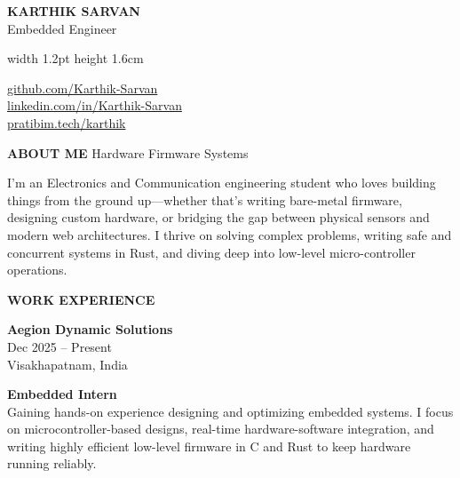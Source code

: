 \documentclass[10pt,a4paper]{article}
\newcommand{\cvsection}[2]{
    \vspace{1.5em}
    \noindent
    \textbf{\uppercase{#1}} \hspace{0.8em} {\color{linegray}\hrulefill} \hspace{0.8em} \textcolor{textblack}{#2}
    \vspace{0.8em}
}
\newcommand{\cvsectionstandard}[1]{
    \vspace{1.5em}
    \noindent
    \textbf{\uppercase{#1}} \hspace{0.8em} {\color{linegray}\hrulefill}
    \vspace{0.8em}
}
\newcommand{\cventry}[6]{
    \noindent
    \begin{minipage}[t]{0.22\textwidth}
        \raggedright
        \textbf{#1} \\[0.4em]
        \textcolor{textgray}{\scriptsize #2} \\[0.2em]
        \textcolor{textgray}{\scriptsize #3}
    \end{minipage}%
    \begin{minipage}[t]{0.04\textwidth}
        \centering \vspace{0.2em} \textcolor{linegray}{\textbullet}
    \end{minipage}%
    \begin{minipage}[t]{0.74\textwidth}
        \raggedright
        \textbf{#4} #5 \\[0.4em]
        \small #6
    \end{minipage}
    \par\vspace{1.2em}
}
\begin{document}
\noindent
\begin{minipage}[c]{0.55\textwidth}
    \raggedright
    {\fontsize{28}{32}\selectfont \textbf{\uppercase{Karthik Sarvan}}} \\ \vspace{0.4em}
    {\Large \textcolor{textgray}{Embedded Engineer}}
\end{minipage}%
\textcolor{linegray}{\vrule width 1.2pt height 1.6cm}%
\hspace{0.04\textwidth}%
\begin{minipage}[c]{0.40\textwidth}
    \raggedleft \small
    \textcolor{textgray}{\faGithub} \hspace{0.3em} \href{https://github.com/Karthik-Sarvan}{github.com/Karthik-Sarvan} \\[0.4em]
    \textcolor{textgray}{\faLinkedin} \hspace{0.3em} \href{https://linkedin.com/in/Karthik-Sarvan}{linkedin.com/in/Karthik-Sarvan} \\[0.4em]
    \textcolor{textgray}{\faGlobe} \hspace{0.3em} \href{https://pratibim.tech/karthik}{pratibim.tech/karthik}
\end{minipage}

\cvsection{About Me}{Hardware \textbar{} Firmware \textbar{} Systems}

\noindent \small
I’m an Electronics and Communication engineering student who loves building things from the ground up—whether that’s writing bare-metal firmware, designing custom hardware, or bridging the gap between physical sensors and modern web architectures. I thrive on solving complex problems, writing safe and concurrent systems in Rust, and diving deep into low-level micro-controller operations.

\cvsectionstandard{Work Experience}

\cventry{Aegion Dynamic Solutions}{Dec 2025 -- Present}{Visakhapatnam, India}{Embedded Intern}{}{
    Gaining hands-on experience designing and optimizing embedded systems. I focus on microcontroller-based designs, real-time hardware-software integration, and writing highly efficient low-level firmware in C and Rust to keep hardware running reliably.
}
\end{document}

